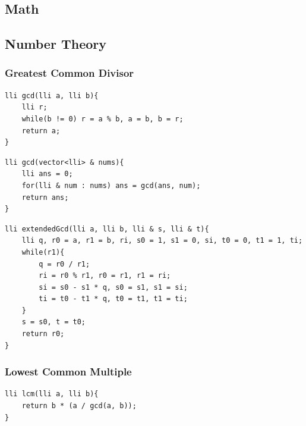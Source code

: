 \documentclass[twoside]{article}
\begin{document}
\begin{multicols*}{2}
\section*{Math}
\vspace{3em}
\subsectionfont{\bfseries\sffamily\centering\LARGE}
\vspace{0em}
\subsection*{Number Theory}
\vspace{2em}
\subsubsectionfont{\large\bfseries\sffamily\underline}
\subsubsection*{Greatest Common Divisor}
\begin{verbatim}
lli gcd(lli a, lli b){
	lli r;
	while(b != 0) r = a % b, a = b, b = r;
	return a;
}

\end{verbatim}
\vspace{-12pt}
\begin{verbatim}
lli gcd(vector<lli> & nums){
	lli ans = 0;
	for(lli & num : nums) ans = gcd(ans, num);
	return ans;
}

\end{verbatim}
\vspace{-12pt}
\begin{verbatim}
lli extendedGcd(lli a, lli b, lli & s, lli & t){
	lli q, r0 = a, r1 = b, ri, s0 = 1, s1 = 0, si, t0 = 0, t1 = 1, ti;
	while(r1){
		q = r0 / r1;
		ri = r0 % r1, r0 = r1, r1 = ri;
		si = s0 - s1 * q, s0 = s1, s1 = si;
		ti = t0 - t1 * q, t0 = t1, t1 = ti;
	}
	s = s0, t = t0;
	return r0;
}

\end{verbatim}

\subsubsectionfont{\large\bfseries\sffamily\underline}
\subsubsection*{Lowest Common Multiple}
\begin{verbatim}
lli lcm(lli a, lli b){
	return b * (a / gcd(a, b));
}


\end{verbatim}
\end{multicols*}
\end{document}
